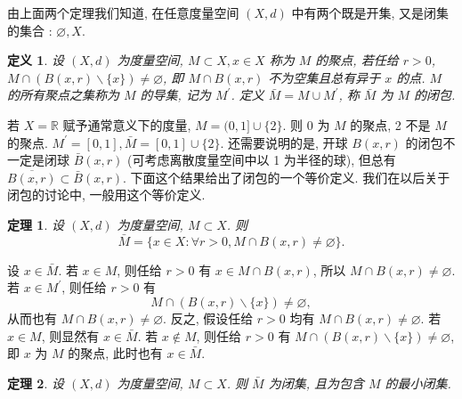 \documentclass[openany]{ctexbook}
\makeatletter
\theoremstyle{kaiti}
\newtheorem{definition}{定义}[section]
\newtheorem{theorem}{定理}[section]
\theoremstyle{normal}
\renewenvironment{proof}[1][\proofname]{\par
    \pushQED{\qed}%
    \normalfont \topsep6\p@\@plus6\p@\relax
    \trivlist
    \item\relax
    {\heiti #1}\hspace{2\labelsep}\ignorespaces
  }{%
    \popQED\endtrivlist\@endpefalse
  }
\makeatother
\begin{document}
由上面两个定理我们知道, 在任意度量空间 $(X, d)$ 中有两个既是开集, 又是闭集的集合 : $\varnothing, X$.

\begin{definition}
  设 $(X, d)$ 为度量空间, $M \subset X, x \in X$ 称为 $M$ 的聚点, 若任给 $r>0$, $M \cap(B(x, r) \backslash\{x\}) \neq \varnothing$, 即 $M \cap B(x, r)$ 不为空集且总有异于 $x$ 的点. $M$ 的所有聚点之集称为 $M$ 的导集, 记为 $M^{\prime}$. 定义 $\bar{M}=M \cup M^{\prime}$, 称 $\bar{M}$ 为 $M$ 的闭包.
\end{definition}

若 $X=\mathbb{R}$ 赋予通常意义下的度量, $M=(0,1] \cup\{2\}$. 则 0 为 $M$ 的聚点, 2 不是 $M$ 的聚点. $M^{\prime}=[0,1], \bar{M}=[0,1] \cup\{2\}$. 还需要说明的是, 开球 $B(x, r)$ 的闭包不一定是闭球 $\bar{B}(x, r)$ (可考虑离散度量空间中以 1 为半径的球), 但总有 $\overline{B(x, r)} \subset \bar{B}(x, r)$. 下面这个结果给出了闭包的一个等价定义. 我们在以后关于闭包的讨论中, 一般用这个等价定义.

\begin{theorem}
  设 $(X, d)$ 为度量空间, $M \subset X$. 则
  \begin{equation}
    \bar{M}=\{x \in X: \forall r>0, M \cap B(x, r) \neq \varnothing\}.
  \end{equation}
\end{theorem}

\begin{proof}
设 $x \in \bar{M}$. 若 $x \in M$, 则任给 $r>0$ 有 $x \in M \cap B(x, r)$, 所以 $M \cap B(x, r) \neq \varnothing$. 若 $x \in M^{\prime}$, 则任给 $r>0$ 有
$$
M \cap(B(x, r) \backslash\{x\}) \neq \varnothing,
$$
从而也有 $M \cap B(x, r) \neq \varnothing$.
反之, 假设任给 $r>0$ 均有 $M \cap B(x, r) \neq \varnothing$. 若 $x \in M$, 则显然有 $x \in \bar{M}$. 若 $x \notin M$, 则任给 $r>0$ 有 $M \cap(B(x, r) \backslash\{x\}) \neq \varnothing$, 即 $x$ 为 $M$ 的聚点, 此时也有 $x \in \bar{M}$.
\end{proof}

\begin{theorem}
  设 $(X, d)$ 为度量空间, $M \subset X$. 则 $\bar{M}$ 为闭集, 且为包含 $M$ 的最小闭集. 
\end{theorem}
\end{document}
